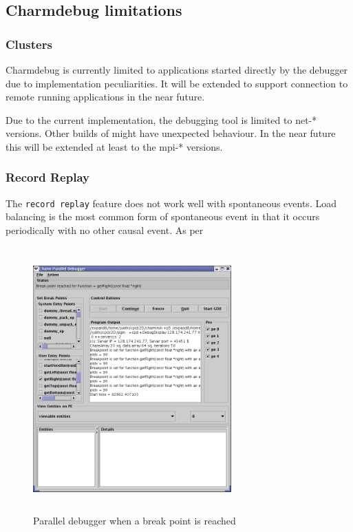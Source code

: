 \documentclass[10pt]{article}
\begin{document}
\subsection{Charmdebug limitations}

\subsubsection{Clusters}

Charmdebug is currently limited to applications started directly by the debugger
due to implementation peculiarities. It will be extended to support connection
to remote running applications in the near future. 

Due to the current implementation, the debugging tool is limited to net-*
versions. Other builds of \charmpp{} might have unexpected behaviour. In the near
future this will be extended at least to the mpi-* versions.

\subsubsection{Record Replay}
The \texttt{record replay} feature does not work well with spontaneous
events.  Load balancing is the most common form of spontaneous event
in that it occurs periodically with no other causal event. As per

\begin{figure}[]
\includegraphics[scale=0.5,height=4in, width=3in]{figs/snapshot3}
\caption{Parallel debugger when a break point is reached}
\label{snapshot3}
\end{figure}
\end{document}
